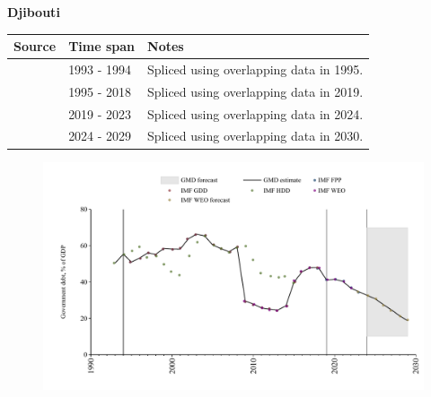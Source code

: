 \documentclass[12pt,a4paper,landscape]{article}
\begin{document}
\begin{adjustbox}{max totalsize={\paperwidth}{\paperheight},center}
\begin{minipage}[t][\textheight][t]{\textwidth}
\vspace*{0.5cm}
{}
\begin{center}
{\Large\bfseries Djibouti}
\end{center}
\vspace{0.5cm}
\begin{table}[H]
\centering
\small
\begin{tabular}{|l|l|l|}
\hline
\textbf{Source} & \textbf{Time span} & \textbf{Notes} \\
\hline
\rowcolor{white}\cite{IMF_HDD}& 1993 - 1994 &Spliced using overlapping data in 1995.\\
\rowcolor{lightgray}\cite{IMF_GDD}& 1995 - 2018 &Spliced using overlapping data in 2019.\\
\rowcolor{white}\cite{IMF_FPP}& 2019 - 2023 &Spliced using overlapping data in 2024.\\
\rowcolor{lightgray}\cite{IMF_WEO_forecast}& 2024 - 2029 &Spliced using overlapping data in 2030.\\
\hline
\end{tabular}
\end{table}
\begin{figure}[H]
\centering
\includegraphics[width=\textwidth,height=0.6\textheight,keepaspectratio]{graphs/DJI_govdebt_GDP.pdf}
\end{figure}
\end{minipage}
\end{adjustbox}
\end{document}
